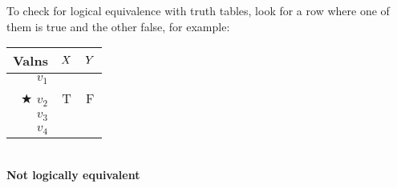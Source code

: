 \begin{highlighted}
		To check for {logical equivalence} with truth tables, look for a row where one of them is true and the other false, for example:
	
	\begin{center}
				\begin{tabular}{r || c |c }
					Valns & $X$ & $Y$ \\
					\hline
					$v_1$&&\\
					$\bigstar$ $v_2$  & T&F\\
					$v_3$&&\\
					$v_4$&&
				\end{tabular}\\ \textbf{Not logically equivalent}
	\end{center}
	
	
\end{highlighted}


